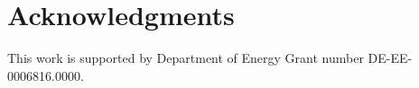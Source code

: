 \documentclass[conference]{IEEEtran}
\begin{document}
\section*{Acknowledgments}
This work is supported by Department of Energy Grant number DE-EE-0006816.0000.

\ifCLASSOPTIONcaptionsoff
  \newpage
\fi


\nocite{ballard, MAS}








% 








\end{document}
